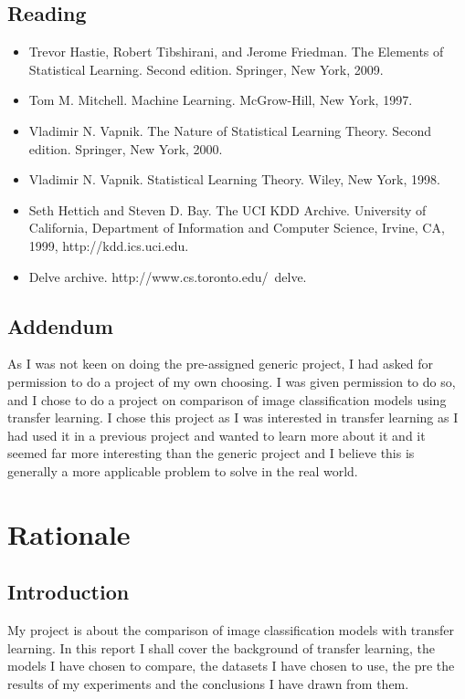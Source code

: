 \documentclass[]{final_report}
\begin{document}
\section*{Reading}
\begin{itemize}
  \item Trevor Hastie, Robert Tibshirani, and Jerome Friedman. The Elements of Statistical Learning. Second edition. Springer, New York, 2009.
  \item Tom M. Mitchell. Machine Learning. McGrow-Hill, New York, 1997.
  \item Vladimir N. Vapnik. The Nature of Statistical Learning Theory. Second edition. Springer, New York, 2000.
  \item Vladimir N. Vapnik. Statistical Learning Theory. Wiley, New York, 1998.
  \item Seth Hettich and Steven D. Bay. The UCI KDD Archive. University of California, Department of Information and Computer Science, Irvine, CA, 1999, http://kdd.ics.uci.edu.
  \item Delve archive. http://www.cs.toronto.edu/~delve.
\end{itemize}

\section*{Addendum}
As I was not keen on doing the pre-assigned generic project, I had asked for permission to do a project of my own choosing.
I was given permission to do so, and I chose to do a project on comparison of image classification models using transfer learning.
I chose this project as I was interested in transfer learning as I had used it in a previous project and wanted to learn more about it
and it seemed far more interesting than the generic project and I believe this is generally a more applicable problem to solve in the real world.

\chapter{Rationale}

\section{Introduction}

My project is about the comparison of image classification models with transfer learning.
In this report I shall cover the background of transfer learning, the models I have chosen to compare, the datasets I have chosen to use, the pre the results of my experiments and the conclusions I have drawn from them.
\end{document}
